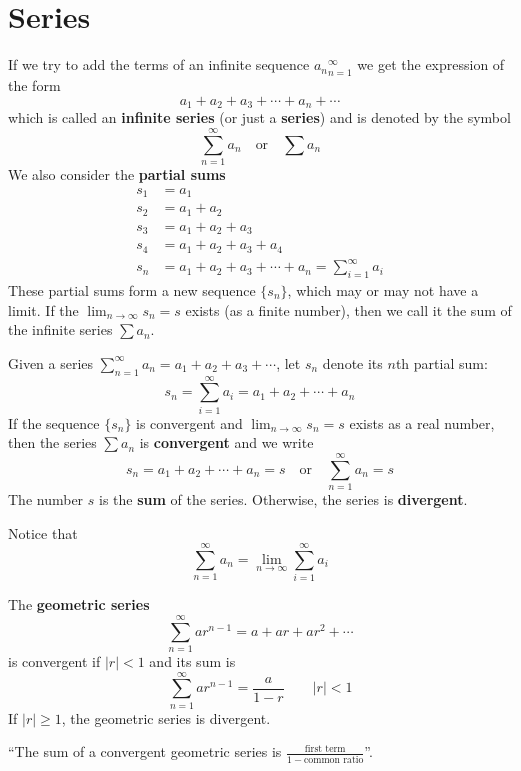 \section{Series}
  If we try to add the terms of an infinite sequence ${a_n}_{n=1}^{\infty}$ we get the expression of the form
  $$a_1+a_2+a_3+\cdots+a_n+\cdots$$
  which is called an \textbf{infinite series} (or just a \textbf{series}) and is denoted by the symbol
  $$\sum_{n=1}^{\infty}a_n \quad\text{or}\quad \sum a_n$$
  We also consider the \textbf{partial sums}
  \begin{align*}
    s_1 &= a_1 \\
    s_2 &= a_1 +a_2 \\
    s_3 &= a_1 +a_2 +a_3 \\
    s_4 &= a_1 +a_2 +a_3 +a_4 \\
    s_n &= a_1 +a_2 +a_3 + \cdots + a_n = \sum_{i=1}^{\infty}a_i
  \end{align*}
  These partial sums form a new sequence $\{s_n\}$, which may or may not have a limit. If the $\lim_{n\to\infty}s_n=s$ exists (as a finite number), then we call it the sum of the infinite series $\sum a_n$.
  \begin{definition}
    Given a series $\sum_{n=1}^{\infty}a_n= a_1 +a_2 +a_3 + \cdots$, let $s_n$ denote its $n$th partial sum:
    $$s_n = \sum_{i=1}^{\infty}a_i = a_1 +a_2 + \cdots + a_n$$
    If the sequence $\{s_n\}$ is convergent and $\lim_{n\to\infty}s_n=s$ exists as a real number, then the series $\sum a_n$ is \textbf{convergent} and we write
    $$s_n = a_1 +a_2 + \cdots + a_n = s \quad\text{or}\quad \sum_{n=1}^{\infty} a_n = s$$
    The number $s$ is the \textbf{sum} of the series. Otherwise, the series is \textbf{divergent}.
  \end{definition}
  Notice that $$\sum_{n=1}^{\infty} a_n = \lim_{n\to\infty}\sum_{i=1}^{\infty}a_i$$
  \begin{minipage}{\linewidth}
    \begin{definition}
      The \textbf{geometric series}
      $$ \sum_{n=1}^{\infty}ar^{n-1} = a + ar + ar^2 + \cdots$$
      is convergent if $|r|<1$ and its sum is
      $$\sum_{n=1}^{\infty}ar^{n-1} = \frac{a}{1-r} \qquad |r|<1$$
      If $|r|\geq 1$, the geometric series is divergent.
    \end{definition}
    ``The sum of a convergent geometric series is $\frac{\text{first term}}{1-\text{common ratio}}$''.
  \end{minipage}
